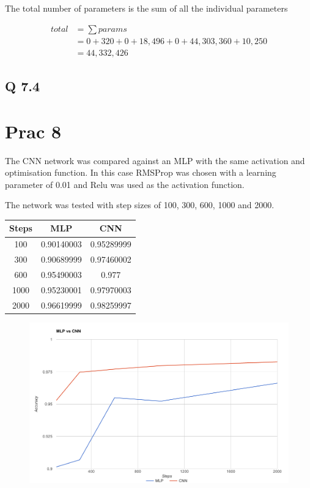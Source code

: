 The total number of parameters is the sum of all the individual parameters

\begin{align*}
	total &= \sum params\\
	&= 0 + 320 + 0 + 18,496 + 0 + 44,303,360 + 10,250\\
	&= 44,332,426
\end{align*}

\subsection*{Q 7.4}

\section*{Prac 8}

The CNN network was compared against an MLP with the same activation and optimisation function.
In this case RMSProp was chosen with a learning parameter of 0.01 and Relu was used as the activation function.

The network was tested with step sizes of 100, 300, 600, 1000 and 2000.

\begin{table}
\centering
\begin{tabular}{|c|c|c|}
\hline
Steps & MLP & CNN \\
\hline
100 & 0.90140003 & 0.95289999 \\
300 & 0.90689999 & 0.97460002 \\
600 & 0.95490003 & 0.977 \\
1000 & 0.95230001 & 0.97970003 \\
2000 & 0.96619999 & 0.98259997 \\
\hline
\end{tabular}
\end{table}

\begin{figure}[H]
	\centering
	\includegraphics[width=\linewidth]{images/q7_cnn_vs_mlp}
\end{figure}

